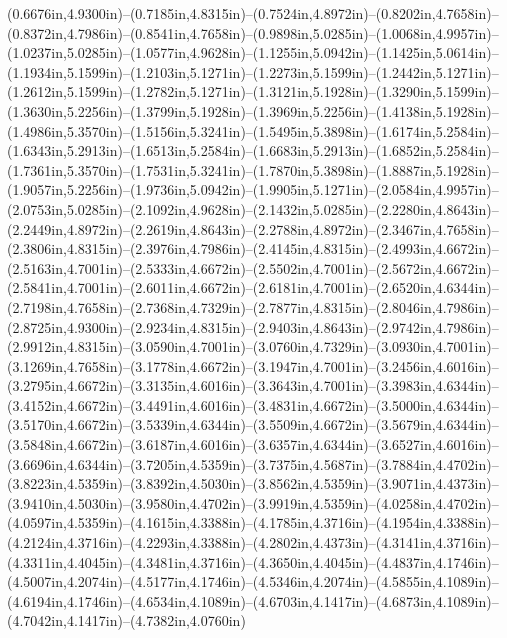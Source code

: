 (0.6676in,4.9300in)--(0.7185in,4.8315in)--(0.7524in,4.8972in)--(0.8202in,4.7658in)--(0.8372in,4.7986in)--(0.8541in,4.7658in)--(0.9898in,5.0285in)--(1.0068in,4.9957in)--(1.0237in,5.0285in)--(1.0577in,4.9628in)--(1.1255in,5.0942in)--(1.1425in,5.0614in)--(1.1934in,5.1599in)--(1.2103in,5.1271in)--(1.2273in,5.1599in)--(1.2442in,5.1271in)--(1.2612in,5.1599in)--(1.2782in,5.1271in)--(1.3121in,5.1928in)--(1.3290in,5.1599in)--(1.3630in,5.2256in)--(1.3799in,5.1928in)--(1.3969in,5.2256in)--(1.4138in,5.1928in)--(1.4986in,5.3570in)--(1.5156in,5.3241in)--(1.5495in,5.3898in)--(1.6174in,5.2584in)--(1.6343in,5.2913in)--(1.6513in,5.2584in)--(1.6683in,5.2913in)--(1.6852in,5.2584in)--(1.7361in,5.3570in)--(1.7531in,5.3241in)--(1.7870in,5.3898in)--(1.8887in,5.1928in)--(1.9057in,5.2256in)--(1.9736in,5.0942in)--(1.9905in,5.1271in)--(2.0584in,4.9957in)--(2.0753in,5.0285in)--(2.1092in,4.9628in)--(2.1432in,5.0285in)--(2.2280in,4.8643in)--(2.2449in,4.8972in)--(2.2619in,4.8643in)--(2.2788in,4.8972in)--(2.3467in,4.7658in)--(2.3806in,4.8315in)--(2.3976in,4.7986in)--(2.4145in,4.8315in)--(2.4993in,4.6672in)--(2.5163in,4.7001in)--(2.5333in,4.6672in)--(2.5502in,4.7001in)--(2.5672in,4.6672in)--(2.5841in,4.7001in)--(2.6011in,4.6672in)--(2.6181in,4.7001in)--(2.6520in,4.6344in)--(2.7198in,4.7658in)--(2.7368in,4.7329in)--(2.7877in,4.8315in)--(2.8046in,4.7986in)--(2.8725in,4.9300in)--(2.9234in,4.8315in)--(2.9403in,4.8643in)--(2.9742in,4.7986in)--(2.9912in,4.8315in)--(3.0590in,4.7001in)--(3.0760in,4.7329in)--(3.0930in,4.7001in)--(3.1269in,4.7658in)--(3.1778in,4.6672in)--(3.1947in,4.7001in)--(3.2456in,4.6016in)--(3.2795in,4.6672in)--(3.3135in,4.6016in)--(3.3643in,4.7001in)--(3.3983in,4.6344in)--(3.4152in,4.6672in)--(3.4491in,4.6016in)--(3.4831in,4.6672in)--(3.5000in,4.6344in)--(3.5170in,4.6672in)--(3.5339in,4.6344in)--(3.5509in,4.6672in)--(3.5679in,4.6344in)--(3.5848in,4.6672in)--(3.6187in,4.6016in)--(3.6357in,4.6344in)--(3.6527in,4.6016in)--(3.6696in,4.6344in)--(3.7205in,4.5359in)--(3.7375in,4.5687in)--(3.7884in,4.4702in)--(3.8223in,4.5359in)--(3.8392in,4.5030in)--(3.8562in,4.5359in)--(3.9071in,4.4373in)--(3.9410in,4.5030in)--(3.9580in,4.4702in)--(3.9919in,4.5359in)--(4.0258in,4.4702in)--(4.0597in,4.5359in)--(4.1615in,4.3388in)--(4.1785in,4.3716in)--(4.1954in,4.3388in)--(4.2124in,4.3716in)--(4.2293in,4.3388in)--(4.2802in,4.4373in)--(4.3141in,4.3716in)--(4.3311in,4.4045in)--(4.3481in,4.3716in)--(4.3650in,4.4045in)--(4.4837in,4.1746in)--(4.5007in,4.2074in)--(4.5177in,4.1746in)--(4.5346in,4.2074in)--(4.5855in,4.1089in)--(4.6194in,4.1746in)--(4.6534in,4.1089in)--(4.6703in,4.1417in)--(4.6873in,4.1089in)--(4.7042in,4.1417in)--(4.7382in,4.0760in) 